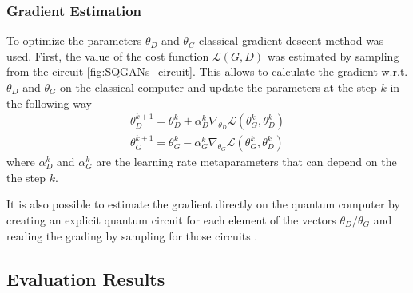 \subsubsection{Gradient Estimation}
To optimize the parameters $\theta_D$ and $\theta_G$ classical gradient descent
method was used. First, the value of the cost function $\mathcal{L}(G, D)$ was
estimated by sampling from the circuit \ref{fig:SQGANs_circuit}. This allows to
calculate the gradient w.r.t. $\theta_D$ and $\theta_G$ on the classical computer
and update the parameters at the step $k$ in the following way
\begin{equation}
  \begin{split}
    \theta^{k+1}_D = \theta^{k}_D + \alpha^k_D\nabla_{\theta_D}\mathcal{L}(\theta^k_G, \theta^k_D) \\
    \theta^{k+1}_G = \theta^{k}_G - \alpha^k_G\nabla_{\theta_G}\mathcal{L}(\theta^k_G, \theta^k_D)
  \end{split}
\end{equation}
where $\alpha^k_D$ and $\alpha^k_G$ are the learning rate metaparameters that can
depend on the the step $k$.

It is also possible to estimate the gradient directly on the quantum computer by
creating an explicit quantum circuit for each element of the vectors $\theta_D / \theta_G$
and reading the grading by sampling for those circuits \cite{Dallaire_Demers_2018}.
\subsection{Evaluation Results}
